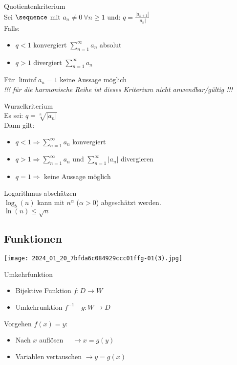 \begin{concept} {Quotientenkriterium}\\
    Sei $\sequence$ mit $a_n \neq 0~\forall n \geq 1$ und: $q = \frac{|a_{n + 1}|}{|a_n|}$\\
    Falls:
    \begin{itemize}
        \item $q < 1$ konvergiert $\sum_{n=1}^\infty a_n$ absolut
        \item $q > 1$ divergiert $\sum_{n=1}^\infty a_n$
    \end{itemize}
    Für $\liminf a_n = 1$ keine Aussage möglich\\
    \emph{!!! für die harmonische Reihe ist dieses Kriterium nicht anwendbar/gültig !!!}
\end{concept}
\begin{concept} {Wurzelkriterium}\\
    Es sei: $q = \sqrt[n]{|a_n|}$\\
    Dann gilt:
    \begin{itemize}
        \item $q < 1 \Rightarrow \sum_{n=1}^\infty a_n$ konvergiert 
        \item $q > 1 \Rightarrow \sum_{n=1}^\infty a_n$ und $\sum_{n=1}^\infty |a_n|$ divergieren
        \item $q = 1 \Rightarrow$ keine Aussage möglich
    \end{itemize}
\end{concept}
\begin{KR}{Logarithmus abschätzen}\\
    $\log_b (n)$ kann mit $n^\alpha$ ($\alpha > 0$) abgeschätzt werden.\\
    $\ln(n) \leq \sqrt{n}$
\end{KR} 

\raggedcolumns
\columnbreak

\subsection{Funktionen}

\begin{center}
    \texttt{[image: 2024\_01\_20\_7bfda6c084929ccc01ffg-01(3).jpg]}
\end{center}


\begin{definition}{Umkehrfunktion}
\begin{itemize}
  \item Bijektive Funktion $f: D \rightarrow W$
  \item Umkehrunktion $f^{-1} \quad g: W \rightarrow D$
\end{itemize}
Vorgehen $f(x)=y$:
\begin{itemize}
  \item Nach $x$ auflösen $\quad \rightarrow x=g(y)$
  \item Variablen vertauschen $\rightarrow y=g(x)$
\end{itemize}
\end{definition}



